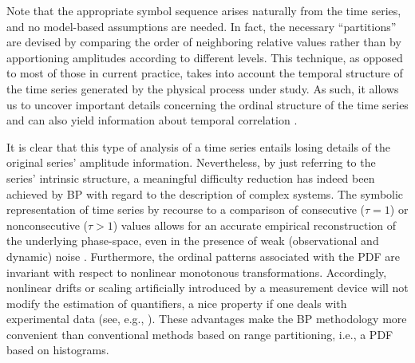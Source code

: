 Note that the appropriate symbol sequence arises naturally from the time series, and no model-based assumptions 
are needed.
In fact, the necessary ``partitions'' are devised by comparing the order of neighboring relative values rather 
than by apportioning amplitudes according to different levels.
This technique, as opposed to most of those in current practice, takes into account the temporal structure of 
the time series generated by the physical process under study.
As such, it allows us to uncover important details concerning the ordinal structure of the time series
\cite{Rosso2007,Rosso2012A,Rosso2012B,Rosso2013} and can also yield information about temporal correlation 
\cite{Rosso2009A,Rosso2009B}.

It is clear that this type of analysis of a time series entails losing details of the original series' 
amplitude information.
Nevertheless, by just referring to the series' intrinsic structure, a meaningful difficulty reduction has 
indeed been achieved by BP with regard to the description of complex systems.
The symbolic representation of time series by recourse to a comparison of consecutive ($\tau = 1$) or 
nonconsecutive ($\tau > 1$) values allows for an accurate empirical reconstruction of the underlying phase-space, 
even in the presence of weak (observational and dynamic) noise \cite{Bandt2002}.
Furthermore, the ordinal patterns associated with the PDF are invariant with respect to nonlinear monotonous 
transformations.
Accordingly, nonlinear drifts or scaling artificially introduced by a measurement device will not modify the 
estimation of quantifiers, a nice property if one deals with experimental data (see, e.g., \cite{Saco2010}).
These advantages make the BP methodology more convenient than conventional methods based on range 
partitioning, i.e., a PDF based on histograms.

